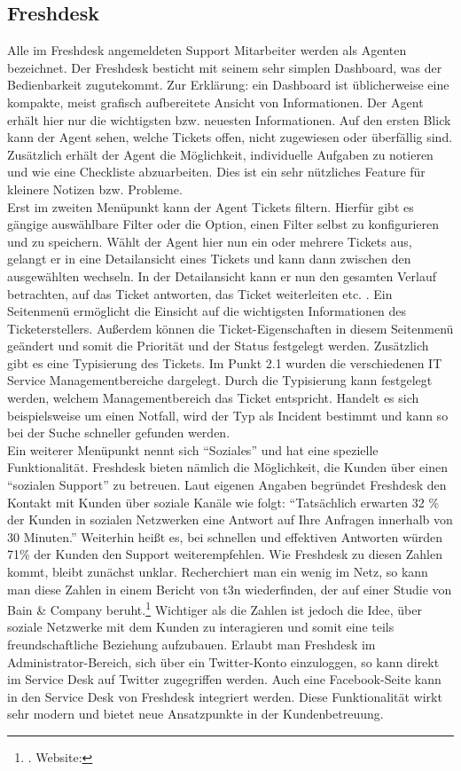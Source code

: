 \subsection{Freshdesk}
\noindent
Alle im Freshdesk angemeldeten Support Mitarbeiter werden als Agenten bezeichnet.
Der Freshdesk besticht mit seinem sehr simplen Dashboard, was der Bedienbarkeit zugutekommt. Zur Erklärung: ein Dashboard ist üblicherweise eine kompakte, meist grafisch aufbereitete Ansicht von Informationen. Der Agent erhält hier nur die wichtigsten bzw. neuesten Informationen. Auf den ersten Blick kann der Agent sehen, welche Tickets offen, nicht zugewiesen oder überfällig sind. Zusätzlich erhält der Agent die Möglichkeit, individuelle Aufgaben zu notieren und wie eine Checkliste abzuarbeiten. Dies ist ein sehr nützliches Feature für kleinere Notizen bzw. Probleme.\\ 
Erst im zweiten Menüpunkt kann der Agent Tickets filtern. Hierfür gibt es gängige auswählbare Filter oder die Option, einen Filter selbst zu konfigurieren und zu speichern. Wählt der Agent hier nun ein oder mehrere Tickets aus, gelangt er in eine Detailansicht eines Tickets und kann dann zwischen den ausgewählten wechseln. In der Detailansicht kann er nun den gesamten Verlauf betrachten, auf das Ticket antworten, das Ticket weiterleiten etc. . Ein Seitenmenü ermöglicht die Einsicht auf die wichtigsten Informationen des Ticketerstellers. Außerdem können die Ticket-Eigenschaften in diesem Seitenmenü geändert und somit die Priorität und der Status festgelegt werden. Zusätzlich gibt es eine Typisierung des Tickets. Im Punkt 2.1 wurden die verschiedenen IT Service Managementbereiche dargelegt. Durch die Typisierung kann festgelegt werden, welchem Managementbereich das Ticket entspricht. Handelt es sich beispielsweise um einen Notfall, wird der Typ als Incident bestimmt und kann so bei der Suche schneller gefunden werden.\\
Ein weiterer Menüpunkt nennt sich \enquote{Soziales} und hat eine spezielle Funktionalität. Freshdesk bieten nämlich die Möglichkeit, die Kunden über einen \enquote{sozialen Support} zu betreuen. Laut eigenen Angaben begründet Freshdesk den Kontakt mit Kunden über soziale Kanäle wie folgt: \enquote{Tatsächlich erwarten 32 \% der Kunden in sozialen Netzwerken eine Antwort auf Ihre Anfragen innerhalb von 30 Minuten.} Weiterhin heißt es, bei schnellen und effektiven Antworten würden 71\% der Kunden den Support weiterempfehlen. Wie Freshdesk zu diesen Zahlen kommt, bleibt zunächst unklar. Recherchiert man ein wenig im Netz, so kann man diese Zahlen in einem Bericht von t3n wiederfinden, der auf einer Studie von  Bain \& Company beruht.\footnote{\citeauthor{Rixecker}. Website:\cite{Rixecker}} Wichtiger als die Zahlen ist jedoch die Idee, über soziale Netzwerke mit dem Kunden zu interagieren und somit eine teils freundschaftliche Beziehung aufzubauen. Erlaubt man Freshdesk im Administrator-Bereich, sich über ein Twitter-Konto einzuloggen, so kann direkt im Service Desk auf Twitter zugegriffen werden. Auch eine Facebook-Seite kann in den Service Desk von Freshdesk integriert werden. Diese Funktionalität wirkt sehr modern und bietet neue Ansatzpunkte in der Kundenbetreuung.\\
